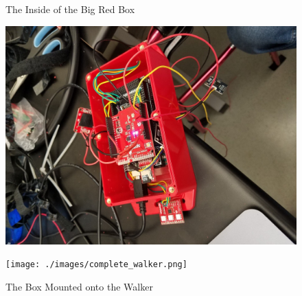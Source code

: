 \documentclass{article}
\begin{document}
\begin{figure} [h!]
	\centering
	\begin{minipage}{.5\textwidth}
		\centering
		\caption {The Inside of the Big Red Box} \label{fig:lidoff}
		\includegraphics[width=.6\textwidth, angle=270]{./images/uncoveredBox.jpg}
	\end{minipage}%
	\begin{minipage}{.5\textwidth}
		\centering
		\caption {The Box Mounted onto the Walker} \label{fig:completeWalker}
		\texttt{[image: ./images/complete\_walker.png]}
	\end{minipage}

\end{figure}
\end{document}
